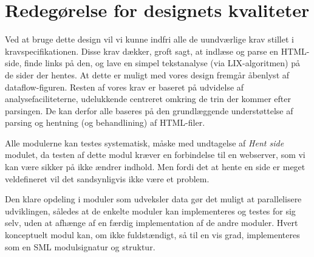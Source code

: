 \documentclass[a4paper,oneside,article, titlepage]{memoir}
\begin{document}
\chapter{Redegørelse for designets kvaliteter}
Ved at bruge dette design vil vi kunne indfri alle de uundværlige krav
stillet i kravspecifikationen. Disse krav dækker, groft sagt, at
indlæse og parse en HTML-side, finde links på den, og lave en simpel
tekstanalyse (via LIX-algoritmen) på de sider der hentes. At dette er
muligt med vores design fremgår åbenlyst af dataflow-figuren. Resten
af vores krav er baseret på udvidelse af analysefaciliteterne,
udelukkende centreret omkring de trin der kommer efter parsingen. De
kan derfor alle baseres på den grundlæggende understøttelse af parsing
og hentning (og behandlining) af HTML-filer.

Alle modulerne kan testes systematisk, måske med undtagelse af
\textit{Hent side} modulet, da testen af dette modul kræver en
forbindelse til en webserver, som vi kan være sikker på ikke ændrer
indhold. Men fordi det at hente en side er meget veldefineret vil det
sandsynligvis ikke være et problem.

Den klare opdeling i moduler som udveksler data gør det muligt at
parallelisere udviklingen, således at de enkelte moduler kan
implementeres og testes for sig selv, uden at afhænge af en færdig
implementation af de andre moduler. Hvert konceptuelt modul kan, om
ikke fuldstændigt, så til en vis grad, implementeres som en SML
modulsignatur og struktur.
\end{document}
